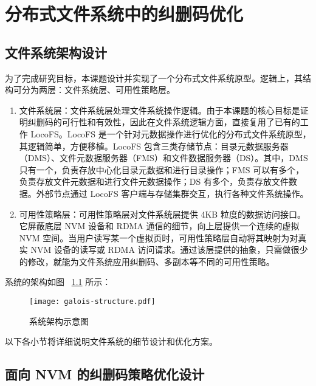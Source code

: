 
\chapter{分布式文件系统中的纠删码优化}
\label{cha:design}


\section{文件系统架构设计}
\label{sec:ch3_struct}

为了完成研究目标，本课题设计并实现了一个分布式文件系统原型。逻辑上，其结构可分为两层：文件系统层、可用性策略层。

\begin{enumerate}[(1)]
    
    \item {\heiti 文件系统层}：文件系统层处理文件系统操作逻辑。由于本课题的核心目标是证明纠删码的可行性和有效性，因此在文件系统逻辑方面，直接复用了已有的工作 LocoFS\cite{locofs2017}。LocoFS 是一个针对元数据操作进行优化的分布式文件系统原型，其逻辑简单，方便移植。LocoFS 包含三类存储节点：目录元数据服务器（DMS）、文件元数据服务器（FMS）和文件数据服务器（DS）。其中，DMS 只有一个，负责存放中心化目录元数据和进行目录操作；FMS 可以有多个，负责存放文件元数据和进行文件元数据操作；DS 有多个，负责存放文件数据。外部节点通过 LocoFS 客户端与存储集群交互，执行各种文件系统操作。
    
    \item {\heiti 可用性策略层}：可用性策略层对文件系统层提供 4KB 粒度的数据访问接口。它屏蔽底层 NVM 设备和 RDMA 通信的细节，向上层提供一个连续的虚拟 NVM 空间。当用户读写某一个虚拟页时，可用性策略层自动将其映射为对真实 NVM 设备的读写或 RDMA 访问请求。通过该层提供的抽象，只需做很少的修改，就能为文件系统应用纠删码、多副本等不同的可用性策略。

\end{enumerate}

系统的架构如图 ~\ref{fig:struct} 所示：

\begin{figure}[H]
    \centering
    \texttt{[image: galois-structure.pdf]}
    \caption{系统架构示意图}
    \label{fig:struct}
\end{figure}

以下各小节将详细说明文件系统的细节设计和优化方案。

\section{面向 NVM 的纠删码策略优化设计}
\label{sec:ch3_ec}


